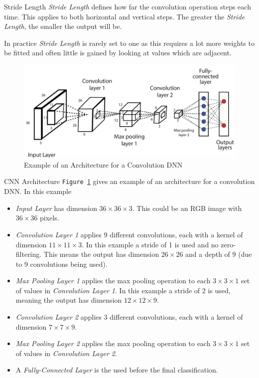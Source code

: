 \documentclass[11pt,a4paper]{article}
\begin{document}
  \begin{definition}{Stride Length}
    \textit{Stride Length} defines how far the convolution operation steps each time. This applies to both horizontal and vertical steps. The greater the \textit{Stride Length}, the smaller the output will be.
    \par In practice \textit{Stride Length} is rarely set to one as this requires a lot more weights to be fitted and often little is gained by looking at values which are adjacent.
  \end{definition}

  \begin{figure}[ht!]
    \centering
    \includegraphics[width=.5\textwidth]{CNNArchitectureDiagram.jpg}
    \caption{Example of an Architecture for a Convolution DNN}
    \label{fig:CNN}
  \end{figure}

  \begin{example}{CNN Architecture}
    \texttt{Figure \ref{fig:CNN}} gives an example of an architecture for a convolution DNN. In this example
    \begin{itemize}
      \item \textit{Input Layer} has dimension $36\times36\times3$. This could be an RGB image with $36\times36$ pixels.
      \item \textit{Convolution Layer 1} applies 9 different convolutions, each with a kernel of dimension $11\times11\times3$. In this example a stride of 1 is used and no zero-filtering. This means the output has dimension $26\times26$ and a depth of $9$ (due to 9 convolutions being used).
      \item \textit{Max Pooling Layer 1} applies the max pooling operation to each  $3\times3\times1$ set of values in \textit{Convolution Layer 1}. In this example a stride of 2 is used, meaning the output has dimension $12\times12\times9$.
      \item \textit{Convolution Layer 2} applies 3 different convolutions, each with a kernel of dimension $7\times7\times9$.
      \item \textit{Max Pooling Layer 2} applies the max pooling operation to each $3\times3\times1$ set of values in \textit{Convolution Layer 2}.
      \item A \textit{Fully-Connected Layer} is the used before the final classification.
    \end{itemize}
  \end{example}
\end{document}
